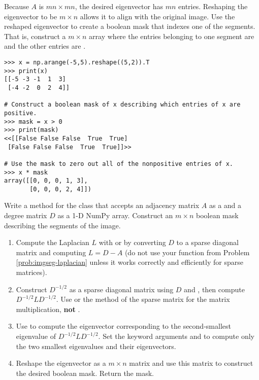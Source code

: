 Because $A$ is $mn\times mn$, the desired eigenvector has $mn$ entries.
Reshaping the eigenvector to be $m \times n$ allows it to align with the original image.
Use the reshaped eigenvector to create a boolean mask that indexes one of the segments.
That is, construct a $m\times n$ array where the entries belonging to one segment are  and the other entries are .

\begin{lstlisting}
>>> x = np.arange(-5,5).reshape((5,2)).T
>>> print(x)
[[-5 -3 -1  1  3]
 [-4 -2  0  2  4]]

# Construct a boolean mask of x describing which entries of x are positive.
>>> mask = x > 0
>>> print(mask)
<<[[False False False  True  True]
 [False False False  True  True]]>>

# Use the mask to zero out all of the nonpositive entries of x.
>>> x * mask
array([[0, 0, 0, 1, 3],
       [0, 0, 0, 2, 4]])
\end{lstlisting}

\begin{problem}
Write a method for the  class that accepts an adjacency matrix $A$ as a  and a degree matrix $D$ as a 1-D NumPy array.
Construct an $m\times n$ boolean mask describing the segments of the image.
\begin{enumerate}
    \item Compute the Laplacian $L$ with  or by converting $D$ to a sparse diagonal matrix and computing $L = D - A$ (do not use your function from Problem \ref{prob:imgseg-laplacian} unless it works correctly and efficiently for sparse matrices).

    \item Construct $D^{-1/2}$ as a sparse diagonal matrix using $D$ and , then compute $D^{-1/2}LD^{-1/2}$.
    Use  or the  method of the sparse matrix for the matrix multiplication, \textbf{not} .

    \item Use  to compute the eigenvector corresponding to the second-smallest eigenvalue of $D^{-1/2} L D^{-1/2}$.
    Set the keyword arguments  and  to compute only the two smallest eigenvalues and their eigenvectors.

    \item Reshape the eigenvector as a $m\times n$ matrix and use this matrix to construct the desired boolean mask.
    Return the mask.
\end{enumerate}
\label{prob:imgseg-compute-mask}
\end{problem}

